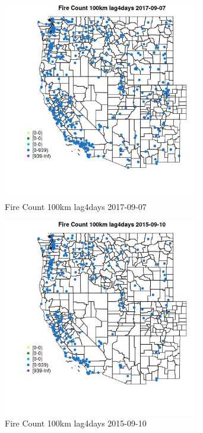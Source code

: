 \begin{figure} 
\centering  
\includegraphics[width=0.77\textwidth]{Code_Outputs/Report_ML_input_PM25_Step4_part_e_de_duplicated_aves_compiled_2019-05-21wNAs_MapObsFire_Count_100km_lag4days2017-09-07.jpg} 
\caption{\label{fig:Report_ML_input_PM25_Step4_part_e_de_duplicated_aves_compiled_2019-05-21wNAsMapObsFire_Count_100km_lag4days2017-09-07}Fire Count 100km lag4days 2017-09-07} 
\end{figure} 
 

\begin{figure} 
\centering  
\includegraphics[width=0.77\textwidth]{Code_Outputs/Report_ML_input_PM25_Step4_part_e_de_duplicated_aves_compiled_2019-05-21wNAs_MapObsFire_Count_100km_lag4days2015-09-10.jpg} 
\caption{\label{fig:Report_ML_input_PM25_Step4_part_e_de_duplicated_aves_compiled_2019-05-21wNAsMapObsFire_Count_100km_lag4days2015-09-10}Fire Count 100km lag4days 2015-09-10} 
\end{figure} 
 

